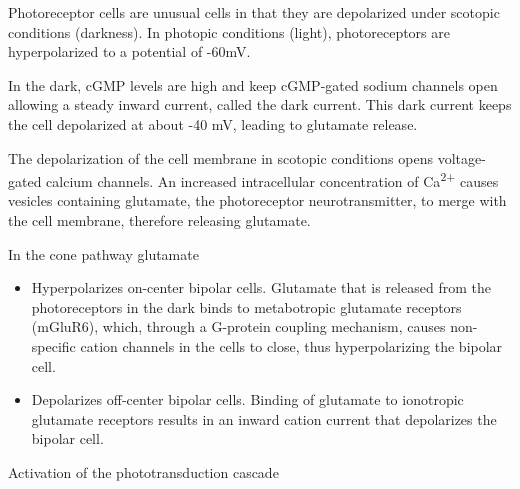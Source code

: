 Photoreceptor cells are unusual cells in that they are depolarized under scotopic conditions (darkness). In photopic conditions (light), photoreceptors are hyperpolarized to a potential of -60mV.

In the dark, cGMP levels are high and keep cGMP-gated sodium channels open allowing a steady inward current, called the dark current. This dark current keeps the cell depolarized at about -40 mV, leading to glutamate release.

The depolarization of the cell membrane in scotopic conditions opens voltage-gated calcium channels. An increased intracellular concentration of Ca\textsuperscript{2+} causes vesicles containing glutamate, the photoreceptor neurotransmitter, to merge with the cell membrane, therefore releasing glutamate.

In the cone pathway glutamate

\begin{itemize}
\tightlist
\item
  Hyperpolarizes on-center bipolar cells. Glutamate that is released from the photoreceptors in the dark binds to metabotropic glutamate receptors (mGluR6), which, through a G-protein coupling mechanism, causes non-specific cation channels in the cells to close, thus hyperpolarizing the bipolar cell.
\item
  Depolarizes off-center bipolar cells. Binding of glutamate to ionotropic glutamate receptors results in an inward cation current that depolarizes the bipolar cell.
\end{itemize}

Activation of the phototransduction cascade

